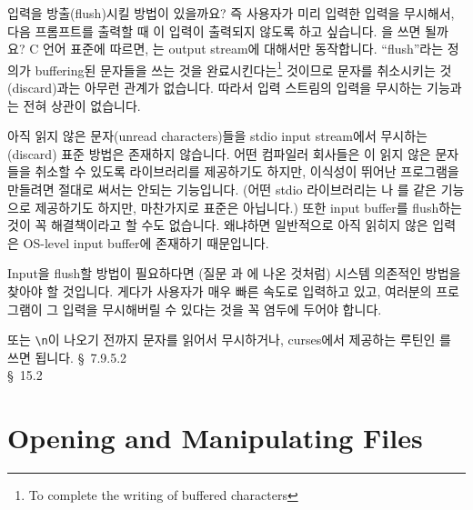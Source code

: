 \begin{faq}
	입력을 방출(flush)시킬 방법이 있을까요? 즉 사용자가 미리 입력한
	입력을 무시해서, 다음 프롬프트를 출력할 때 이 입력이 출력되지 않도록
	하고 싶습니다.  을 쓰면 될까요?
\A
	C 언어 표준에 따르면,
        는 output stream에 대해서만 동작합니다.
	``flush''라는 정의가 buffering된 문자들을 쓰는 것을 
	완료시킨다는\footnote{To complete the writing of buffered characters}
	것이므로 문자를 취소시키는 것(discard)과는 아무런 관계가 없습니다.
	따라서 
	입력 스트림의 입력을 무시하는 기능과는 전혀 상관이 없습니다.

	아직 읽지 않은 문자(unread characters)들을 stdio input stream에서
        무시하는(discard) 표준 방법은 존재하지 않습니다.
	어떤 컴파일러 회사들은 이 읽지 않은 문자들을 취소할 수
	있도록 라이브러리를 제공하기도 하지만, 이식성이 뛰어난 프로그램을
	만들려면 절대로 써서는 안되는 기능입니다.
	(어떤 stdio 라이브러리는 나 를 같은 기능으로
	제공하기도 하지만, 마찬가지로 표준은 아닙니다.)
	또한 input buffer를 flush하는 것이 꼭 해결책이라고 할 수도 없습니다.
	왜냐하면
	일반적으로 아직 읽히지 않은 입력은 OS-level input buffer에
	존재하기 때문입니다. 

	Input을 flush할 방법이 필요하다면 (질문 과 에 나온 것처럼)
	시스템 의존적인 방법을 찾아야 할 것입니다. 
	게다가 사용자가 매우 빠른 속도로 입력하고 있고, 여러분의 프로그램이
	그 입력을 무시해버릴 수 있다는 것을 꼭 염두에 두어야 합니다.

	또는 \verb+\n+이 나오기 전까지 문자를 읽어서 무시하거나,
        curses에서 제공하는 루틴인 를 쓰면 됩니다.
\R
	\cite{c89} \S\ 7.9.5.2 \\
	\cite{hs} \S\ 15.2
\end{faq}

\section{Opening and Manipulating Files}	\label{sec:openmanfile}

